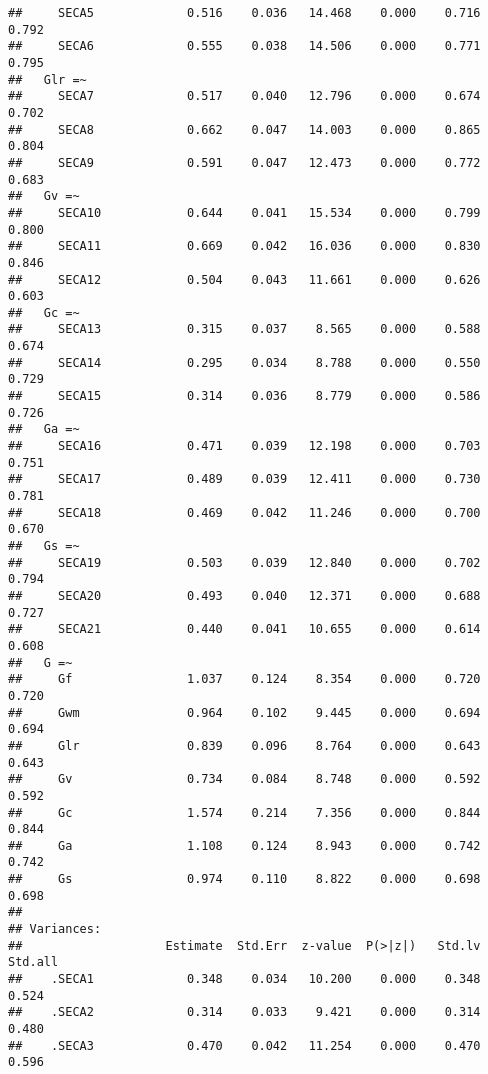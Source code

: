 \documentclass[
]{article}
\begin{document}
\begin{verbatim}
##     SECA5             0.516    0.036   14.468    0.000    0.716    0.792
##     SECA6             0.555    0.038   14.506    0.000    0.771    0.795
##   Glr =~                                                                
##     SECA7             0.517    0.040   12.796    0.000    0.674    0.702
##     SECA8             0.662    0.047   14.003    0.000    0.865    0.804
##     SECA9             0.591    0.047   12.473    0.000    0.772    0.683
##   Gv =~                                                                 
##     SECA10            0.644    0.041   15.534    0.000    0.799    0.800
##     SECA11            0.669    0.042   16.036    0.000    0.830    0.846
##     SECA12            0.504    0.043   11.661    0.000    0.626    0.603
##   Gc =~                                                                 
##     SECA13            0.315    0.037    8.565    0.000    0.588    0.674
##     SECA14            0.295    0.034    8.788    0.000    0.550    0.729
##     SECA15            0.314    0.036    8.779    0.000    0.586    0.726
##   Ga =~                                                                 
##     SECA16            0.471    0.039   12.198    0.000    0.703    0.751
##     SECA17            0.489    0.039   12.411    0.000    0.730    0.781
##     SECA18            0.469    0.042   11.246    0.000    0.700    0.670
##   Gs =~                                                                 
##     SECA19            0.503    0.039   12.840    0.000    0.702    0.794
##     SECA20            0.493    0.040   12.371    0.000    0.688    0.727
##     SECA21            0.440    0.041   10.655    0.000    0.614    0.608
##   G =~                                                                  
##     Gf                1.037    0.124    8.354    0.000    0.720    0.720
##     Gwm               0.964    0.102    9.445    0.000    0.694    0.694
##     Glr               0.839    0.096    8.764    0.000    0.643    0.643
##     Gv                0.734    0.084    8.748    0.000    0.592    0.592
##     Gc                1.574    0.214    7.356    0.000    0.844    0.844
##     Ga                1.108    0.124    8.943    0.000    0.742    0.742
##     Gs                0.974    0.110    8.822    0.000    0.698    0.698
## 
## Variances:
##                    Estimate  Std.Err  z-value  P(>|z|)   Std.lv  Std.all
##    .SECA1             0.348    0.034   10.200    0.000    0.348    0.524
##    .SECA2             0.314    0.033    9.421    0.000    0.314    0.480
##    .SECA3             0.470    0.042   11.254    0.000    0.470    0.596

\end{verbatim}
\end{document}
